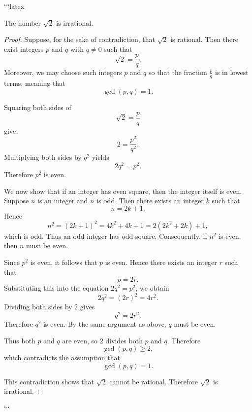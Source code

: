 ```latex
\begin{theorem}
The number $\sqrt{2}$ is irrational.
\end{theorem}

\begin{proof}
Suppose, for the sake of contradiction, that $\sqrt{2}$ is rational. Then there exist integers $p$ and $q$ with $q \neq 0$ such that
\[
\sqrt{2} = \frac{p}{q}.
\]
Moreover, we may choose such integers $p$ and $q$ so that the fraction $\frac{p}{q}$ is in lowest terms, meaning that
\[
\gcd(p,q) = 1.
\]

Squaring both sides of
\[
\sqrt{2} = \frac{p}{q}
\]
gives
\[
2 = \frac{p^2}{q^2}.
\]
Multiplying both sides by $q^2$ yields
\[
2q^2 = p^2.
\]
Therefore $p^2$ is even.

We now show that if an integer has even square, then the integer itself is even. Suppose $n$ is an integer and $n$ is odd. Then there exists an integer $k$ such that
\[
n = 2k+1.
\]
Hence
\[
n^2 = (2k+1)^2 = 4k^2+4k+1 = 2(2k^2+2k)+1,
\]
which is odd. Thus an odd integer has odd square. Consequently, if $n^2$ is even, then $n$ must be even.

Since $p^2$ is even, it follows that $p$ is even. Hence there exists an integer $r$ such that
\[
p = 2r.
\]
Substituting this into the equation $2q^2 = p^2$, we obtain
\[
2q^2 = (2r)^2 = 4r^2.
\]
Dividing both sides by $2$ gives
\[
q^2 = 2r^2.
\]
Therefore $q^2$ is even. By the same argument as above, $q$ must be even.

Thus both $p$ and $q$ are even, so $2$ divides both $p$ and $q$. Therefore
\[
\gcd(p,q) \geq 2,
\]
which contradicts the assumption that
\[
\gcd(p,q) = 1.
\]

This contradiction shows that $\sqrt{2}$ cannot be rational. Therefore $\sqrt{2}$ is irrational.
\end{proof}
```